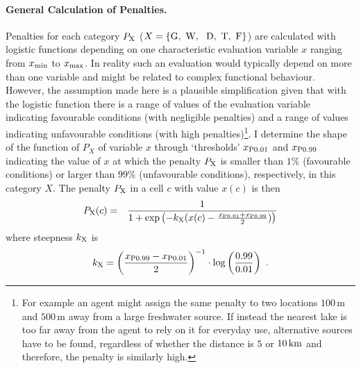 \paragraph{General Calculation of Penalties.}
Penalties for each category $P_{\rm X}$ ($X=\{\text{G,\, W, \, D,\, T,\, F}\}$) are calculated with logistic functions depending on one characteristic evaluation variable $x$ ranging from $x_{\rm min}$ to $x_{\rm max}$.
In reality such an evaluation would typically depend on more than one variable and might be related to complex functional behaviour.
However, the assumption made here is a plausible simplification given that with the logistic function there is a range of values of the evaluation variable indicating favourable conditions (with negligible penalties) and a range of values indicating unfavourable conditions (with high penalties)\footnote{For example an agent might assign the same penalty to two locations $100\, \text{m}$ and $500\, \text{m}$ away from a large freshwater source. If instead the nearest lake is too far away from the agent to rely on it for everyday use, alternative sources have to be found, regardless of whether the distance is $5$ or $10\, {\rm km}$ and therefore, the penalty is similarly high.}.
I determine the shape of the function of $P_X$ of variable $x$ through `thresholds' $x_{\rm P0.01}$ and $x_{\rm P0.99}$ indicating the value of $x$ at which the penalty $P_{\rm X}$ is smaller than $1\%$ (favourable conditions) or larger than $99\%$ (unfavourable conditions), respectively, in this category $X$.
The penalty $P_{\rm X}$ in a cell $c$ with value $x(c)$ is then
\begin{eqnarray}\label{eq:P_X(c)}
	P_{\rm X}(c) & = & \frac{1}{1+\exp\left( - k_{\rm X} (x(c)-\frac{x_{\rm P0.01}+x_{\rm P0.99}}{2}) \right)} %
\end{eqnarray}
where steepness $k_{\rm X}$ is 
\begin{equation}\label{eq:k}
k_{\rm X} = \left(\frac{x_{\rm P0.99}-{x_{\rm P0.01}}}{2}\right)^{-1} \cdot \log\left(\frac{0.99}{0.01}\right) \ .
\end{equation}
